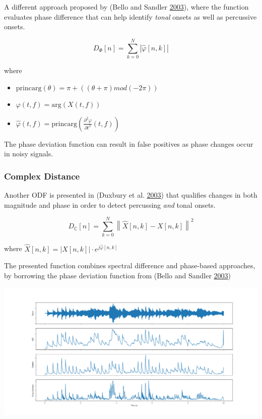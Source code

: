 \documentclass[
  american,
]{article}
\providecommand{\tightlist}{%
  \setlength{\itemsep}{0pt}\setlength{\parskip}{0pt}}
\begin{document}
A different approach proposed by (Bello and Sandler \protect\hyperlink{ref-bello}{2003}), where the function
evaluates phase difference that can help identify \emph{tonal}
onsets as well as percussive onsets.

\[D_{\Phi}[n] = \sum\limits_{k=0}^{N}
    \left\lvert \hat{\varphi}[n, k] \right\rvert\]

where

\begin{itemize}
\tightlist
\item
  \(\mathrm{princarg}(\theta) = \pi + ((\theta + \pi) mod (-2\pi))\)
\item
  \(\varphi(t, f) = \mathrm{arg}(X(t, f))\)
\item
  \(\hat{\varphi}(t, f) = \mathrm{princarg} \left( \frac{\partial^2 \varphi}{\partial t^2}(t, f) \right)\)
\end{itemize}

The phase deviation function can result in false positives as
phase changes occur in noisy signals.

\hypertarget{complex-distance}{%
\subsubsection{Complex Distance}\label{complex-distance}}

Another ODF is presented in (Duxbury et al. \protect\hyperlink{ref-duxbury}{2003}) that qualifies changes in both
magnitude and phase in order to detect percussing \emph{and} tonal onsets.

\[D_{\mathbb{C}}[n] = \sum\limits_{k=0}^{N}
    \left\lVert\hat{X}[n, k] - X[n, k]\right\rVert^2\]

where
\(\hat{X}[n, k] = \left\lvert X[n, k]\right\rvert \cdot e^{j\hat{\varphi}[n, k]}\)

The presented function combines spectral difference and phase-based approaches,
by borrowing the phase deviation function from (Bello and Sandler \protect\hyperlink{ref-bello}{2003})

\includegraphics{plot/odf.png}
\end{document}
